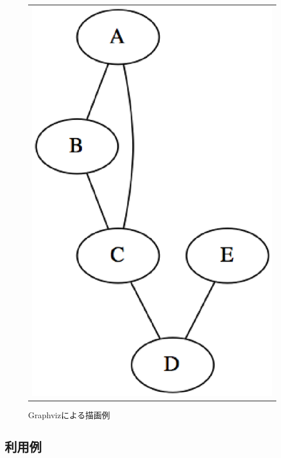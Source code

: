 \begin{figure}[htbp]
\begin{center}
\begin{tabular}{c}

\begin{minipage}{1.0\hsize}
\begin{center}
\includegraphics[scale=0.5]{figure/mgv0.eps}
\caption{Graphvizによる描画例\label{fig:mgv0}}
\end{center}
\end{minipage}

\end{tabular}
\end{center}
\end{figure}

\newpage
\subsection{利用例}


%


